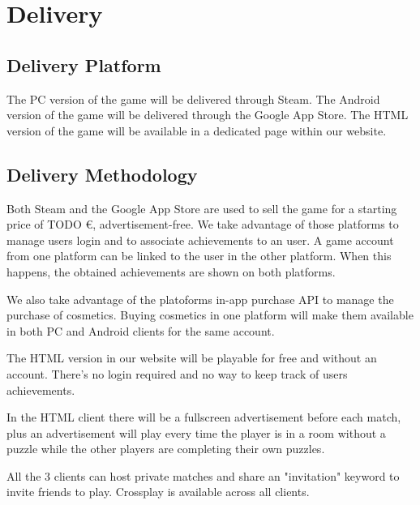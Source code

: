 \section{Delivery}

\subsection{Delivery Platform}
The PC      version of the game will be delivered through Steam. 
The Android version of the game will be delivered through the Google App Store.
The HTML    version of the game will be available in a dedicated page within our website.

\subsection{Delivery Methodology}
Both Steam and the Google App Store are used to sell the game for a starting price of TODO €, advertisement-free. We take advantage of those platforms to manage users login and to associate achievements to an user. A game account from one platform can be linked to the user in the other platform. When this happens, the obtained achievements are shown on both platforms. 


We also take advantage of the platoforms in-app purchase API to manage the purchase of cosmetics. Buying cosmetics in one platform will make them available in both PC and Android clients for the same account.

The HTML version in our website will be playable for free and without an account. 
There's no login required and no way to keep track of users achievements.

In the HTML client there will be a fullscreen advertisement before each match, plus an advertisement will play every time the player is in a room without a puzzle while the other players are completing their own puzzles.

All the 3 clients can host private matches and share an "invitation" keyword to invite friends to play. Crossplay is available across all clients.

\pagebreak 